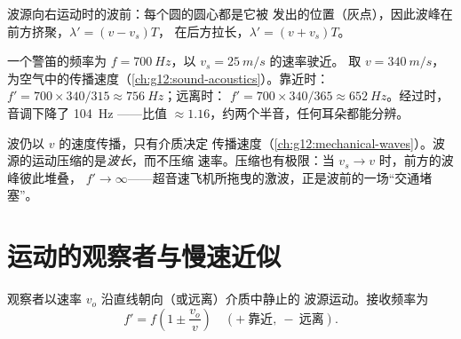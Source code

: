 \begin{omfigure}

{\small 波源向右运动时的波前：每个圆的圆心都是它被
发出的位置（灰点），因此波峰在前方挤聚，$\lambda' = (v - v_s)T$，
在后方拉长，$\lambda' = (v + v_s)T$。}
\end{omfigure}

\begin{example}[用数字看救护车]\label{ex:g12:doppler-effect:siren}
一个警笛的频率为 $f = \qty{700}{Hz}$，以 $v_s = \qty{25}{m/s}$ 的速率驶近。
取 $v = \qty{340}{m/s}$，为空气中的传播速度（\cref{ch:g12:sound-acoustics}）。靠近时：
$f' = 700 \times 340/315 \approx \qty{756}{Hz}$；远离时：
$f' = 700 \times 340/365 \approx \qty{652}{Hz}$。经过时，音调下降了 \qty{104}{Hz}
——比值 $\approx 1.16$，约两个半音，任何耳朵都能分辨。
\end{example}

\begin{remark}[运动不改变什么]\label{rem:g12:doppler-effect:speed-unchanged}
波仍以 $v$ 的速度传播，只有介质决定
传播速度（\cref{ch:g12:mechanical-waves}）。波源的运动压缩的是\emph{波长}，而不压缩
速率。压缩也有极限：当 $v_s \to v$ 时，前方的波峰彼此堆叠，
$f' \to \infty$——超音速飞机所拖曳的激波，正是波前的一场“交通堵塞”。
\end{remark}

\section{运动的观察者与慢速近似}

\begin{proposition}[运动的观察者]\label{prop:g12:doppler-effect:moving-observer}
观察者以速率 $v_o$ 沿直线朝向（或远离）介质中静止的
波源运动。接收频率为
\[ f' = f\left(1 \pm \frac{v_o}{v}\right) \quad (+\ \text{靠近},\ -\ \text{远离}). \]
\end{proposition}

